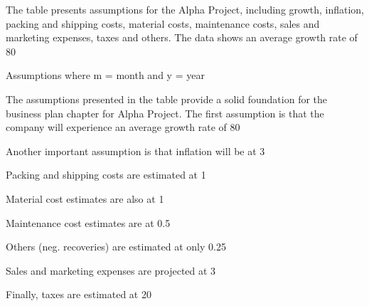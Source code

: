 
The table presents assumptions for the Alpha Project, including growth, inflation, packing and shipping costs, material costs, maintenance costs, sales and marketing expenses, taxes and others. The data shows an average growth rate of 80%

Assumptions where m = month and y = year

The assumptions presented in the table provide a solid foundation for the business plan chapter for Alpha Project. The first assumption is that the company will experience an average growth rate of 80%

Another important assumption is that inflation will be at 3%

Packing and shipping costs are estimated at 1%

Material cost estimates are also at 1%

Maintenance cost estimates are at 0.5%

Others (neg. recoveries) are estimated at only 0.25%

Sales and marketing expenses are projected at 3%

Finally, taxes are estimated at 20%

